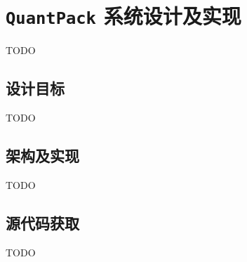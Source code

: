 \chapter{\texttt{QuantPack} 系统设计及实现} \label{chap::quant_pack}
TODO
\section{设计目标}
TODO
\section{架构及实现}
TODO
\section{源代码获取}
TODO
